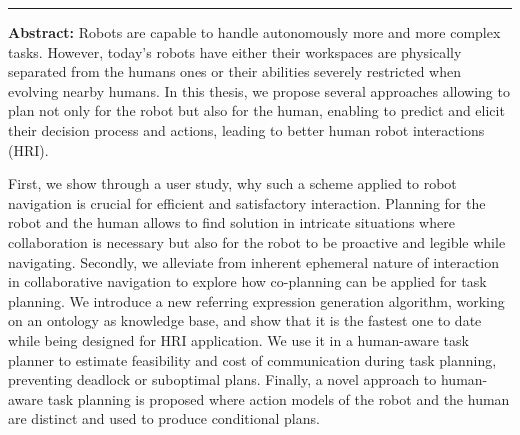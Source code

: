 \documentclass[english,a4paper,11pt,twoside]{StyleThese}
\begin{document}
\cleardoublepage
\begin{vcenterpage}
\noindent\rule[2pt]{\textwidth}{0.5pt}

\textbf{Abstract:}
Robots are capable to handle autonomously more and more complex tasks. However, today's robots have either their workspaces are physically separated from the humans ones or their abilities severely restricted when evolving nearby humans. In this thesis, we propose several approaches allowing to plan not only for the robot but also for the human, enabling to predict and elicit their decision process and actions, leading to better human robot interactions (HRI). 

First, we show through a user study, why such a scheme applied to robot navigation is crucial for efficient and satisfactory interaction. Planning for the robot and the human allows to find solution in intricate situations where collaboration is necessary but also for the robot to be proactive and legible while navigating. Secondly, we alleviate from inherent ephemeral nature of interaction in collaborative navigation to explore how co-planning can be applied for task planning. We introduce a new referring expression generation algorithm, working on an ontology as knowledge base, and show that it is the fastest one to date while being designed for HRI application. We use it in a human-aware task planner to estimate feasibility and cost of communication during task planning, preventing deadlock or suboptimal plans. Finally, a novel approach to human-aware task planning is proposed where action models of the robot and the human are distinct and used to produce conditional plans.
\begin{comment}
As technology progresses, more and more complex tasks can be automated. However, robots seldom consider the nearby humans in their decision making processes. This result in today robots usage to be separated from human environment or to be overdefensive when evolving close to humans. We claim that bringing the robot and the human workspace closer would allow to use their complementarity to perform more complex tasks in collaboration, more efficiently and with more satisfaction for the human.


\end{comment}
\end{vcenterpage}
\end{document}
